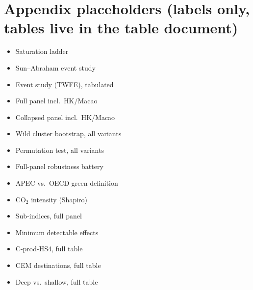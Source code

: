 \documentclass[11pt]{article}
\begin{document}
\newpage
\appendix
\section*{Appendix placeholders (labels only, tables live in the table document)}
\footnotesize
\begin{itemize}\itemsep2pt
\item Saturation ladder \label{tab:ladder_wb}\label{tab:ladder_trend}
\item Sun--Abraham event study \label{tab:sunab}
\item Event study (TWFE), tabulated \label{tab:eventstudy_twfe}
\item Full panel incl.\ HK/Macao \label{tab:fullpanel_inclHKMO}
\item Collapsed panel incl.\ HK/Macao \label{tab:collapsed_inclHKMO}
\item Wild cluster bootstrap, all variants \label{tab:wcb}
\item Permutation test, all variants \label{tab:perm}
\item Full-panel robustness battery \label{tab:robust-full}
\item APEC vs.\ OECD green definition \label{tab:apec}
\item CO$_2$ intensity (Shapiro) \label{tab:co2}
\item Sub-indices, full panel \label{tab:subindex_fullpanel}
\item Minimum detectable effects \label{tab:mde}
\item C-prod-HS4, full table \label{tab:cprodhs4}
\item CEM destinations, full table \label{tab:cem}
\item Deep vs.\ shallow, full table \label{tab:deepshallow}
\end{itemize}
\normalsize
\end{document}
